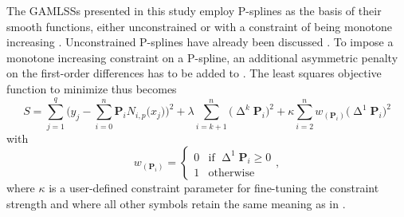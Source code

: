 The GAMLSSs presented in this study employ P-splines as the basis of their smooth functions, either unconstrained \parencite{Eilers1996} or with a constraint of being monotone increasing \parencite{Bollaerts2006}.  Unconstrained P-splines have already been discussed .  To impose a monotone increasing constraint on a P-spline, an additional asymmetric penalty on the first-order differences has to be added to .  The least squares objective function to minimize thus becomes
\begin{equation}
  \label{eq:PSplineOLSMonotoneIncreasingConstraint}
  S =
  \sum_{j = 1}^q 
  \Biggl(
  y_j - \sum_{i = 0}^n \symbf{P}_i N_{i, p}\bigl(x_j\bigr)
  \Biggr)^2
  + \lambda \sum_{i = k + 1}^n \bigl(\upDelta^k \symbf{P}_i\bigr)^2
  + \kappa \sum_{i = 2}^n w_{(\symbf{P}_i)}\bigl(\upDelta^1 \symbf{P}_i\bigr)^2
\end{equation}
with
\begin{equation}
  \label{eq:PSlineOLSMonotoneIncreasingConstraintWFunction}
  w_{(\symbf{P}_i)} =
  \begin{cases}
    0 &\text{if } \upDelta^1 \symbf{P}_i \geq 0 \\
    1 &\text{otherwise}
  \end{cases},
\end{equation}
where \(\kappa\) is a user-defined constraint parameter for fine-tuning the constraint strength and where all other symbols retain the same meaning as in  \parencite{Bollaerts2006}.

